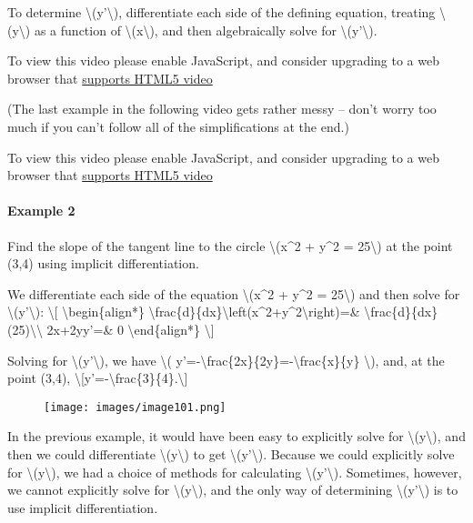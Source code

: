 To determine \textbackslash{}(y'\textbackslash{}), differentiate each
side of the defining equation, treating
\textbackslash{}(y\textbackslash{}) as a function of
\textbackslash{}(x\textbackslash{}), and then algebraically solve for
\textbackslash{}(y'\textbackslash{}).

To view this video please enable JavaScript, and consider upgrading to a
web browser that \href{http://videojs.com/html5-video-support/}{supports
HTML5 video}

(The last example in the following video gets rather messy -- don't
worry too much if you can't follow all of the simplifications at the
end.)

To view this video please enable JavaScript, and consider upgrading to a
web browser that \href{http://videojs.com/html5-video-support/}{supports
HTML5 video}

\hypertarget{example-2}{%
\paragraph{Example 2}\label{example-2}}

Find the slope of the tangent line to the circle \textbackslash{}(x\^{}2
+ y\^{}2 = 25\textbackslash{}) at the point (3,4) using implicit
differentiation.

We differentiate each side of the equation \textbackslash{}(x\^{}2 +
y\^{}2 = 25\textbackslash{}) and then solve for
\textbackslash{}(y'\textbackslash{}): \textbackslash{}{[}
\textbackslash{}begin\{align*\}
\textbackslash{}frac\{d\}\{dx\}\textbackslash{}left(x\^{}2+y\^{}2\textbackslash{}right)=\&
\textbackslash{}frac\{d\}\{dx\}(25)\textbackslash{}\textbackslash{}
2x+2yy'=\& 0 \textbackslash{}end\{align*\} \textbackslash{}{]}

Solving for \textbackslash{}(y'\textbackslash{}), we have
\textbackslash{}(
y'=-\textbackslash{}frac\{2x\}\{2y\}=-\textbackslash{}frac\{x\}\{y\}
\textbackslash{}), and, at the point (3,4),
\textbackslash{}{[}y'=-\textbackslash{}frac\{3\}\{4\}.\textbackslash{}{]}

\begin{figure}
\centering
\texttt{[image: images/image101.png]}
\caption{}
\end{figure}

In the previous example, it would have been easy to explicitly solve for
\textbackslash{}(y\textbackslash{}), and then we could differentiate
\textbackslash{}(y\textbackslash{}) to get
\textbackslash{}(y'\textbackslash{}). Because we could explicitly solve
for \textbackslash{}(y\textbackslash{}), we had a choice of methods for
calculating \textbackslash{}(y'\textbackslash{}). Sometimes, however, we
cannot explicitly solve for \textbackslash{}(y\textbackslash{}), and the
only way of determining \textbackslash{}(y'\textbackslash{}) is to use
implicit differentiation.

